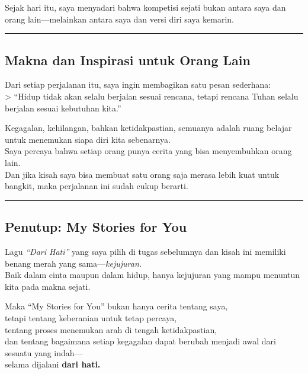 \documentclass[
  letterpaper,
  DIV=11,
  numbers=noendperiod]{scrreprt}
\begin{document}
Sejak hari itu, saya menyadari bahwa kompetisi sejati bukan antara saya
dan orang lain---melainkan antara saya dan versi diri saya kemarin.

\begin{center}\rule{0.5\linewidth}{0.5pt}\end{center}

\subsection{\texorpdfstring{\textbf{Makna dan Inspirasi untuk Orang
Lain}}{Makna dan Inspirasi untuk Orang Lain}}\label{makna-dan-inspirasi-untuk-orang-lain}

Dari setiap perjalanan itu, saya ingin membagikan satu pesan
sederhana:\\
\textgreater{} ``Hidup tidak akan selalu berjalan sesuai rencana, tetapi
rencana Tuhan selalu berjalan sesuai kebutuhan kita.''

Kegagalan, kehilangan, bahkan ketidakpastian, semuanya adalah ruang
belajar untuk menemukan siapa diri kita sebenarnya.\\
Saya percaya bahwa setiap orang punya cerita yang bisa menyembuhkan
orang lain.\\
Dan jika kisah saya bisa membuat satu orang saja merasa lebih kuat untuk
bangkit, maka perjalanan ini sudah cukup berarti.

\begin{center}\rule{0.5\linewidth}{0.5pt}\end{center}

\subsection{\texorpdfstring{\textbf{Penutup: My Stories for
You}}{Penutup: My Stories for You}}\label{penutup-my-stories-for-you}

Lagu \emph{``Dari Hati''} yang saya pilih di tugas sebelumnya dan kisah
ini memiliki benang merah yang sama---\emph{kejujuran.}\\
Baik dalam cinta maupun dalam hidup, hanya kejujuran yang mampu menuntun
kita pada makna sejati.

Maka ``My Stories for You'' bukan hanya cerita tentang saya,\\
tetapi tentang keberanian untuk tetap percaya,\\
tentang proses menemukan arah di tengah ketidakpastian,\\
dan tentang bagaimana setiap kegagalan dapat berubah menjadi awal dari
sesuatu yang indah---\\
selama dijalani \textbf{dari hati.}
\end{document}
